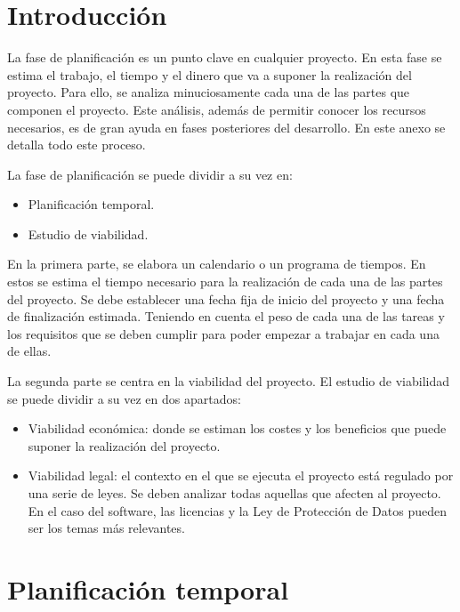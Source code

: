 
\section{Introducción}\label{introduccion-plan}

La fase de planificación es un punto clave en cualquier proyecto. En
esta fase se estima el trabajo, el tiempo y el dinero que va a suponer
la realización del proyecto. Para ello, se analiza minuciosamente cada
una de las partes que componen el proyecto. Este análisis, además de
permitir conocer los recursos necesarios, es de gran ayuda en fases
posteriores del desarrollo. En este anexo se detalla todo este proceso.

La fase de planificación se puede dividir a su vez en:

\begin{itemize}
\tightlist
\item
  Planificación temporal.
\item
  Estudio de viabilidad.
\end{itemize}

En la primera parte, se elabora un calendario o un programa de tiempos.
En estos se estima el tiempo necesario para la realización de cada una
de las partes del proyecto. Se debe establecer una fecha fija de inicio
del proyecto y una fecha de finalización estimada. Teniendo en cuenta el
peso de cada una de las tareas y los requisitos que se deben cumplir
para poder empezar a trabajar en cada una de ellas.

La segunda parte se centra en la viabilidad del proyecto. El estudio de
viabilidad se puede dividir a su vez en dos apartados:

\begin{itemize}
\tightlist
\item
  Viabilidad económica: donde se estiman los costes y los beneficios que
  puede suponer la realización del proyecto.
\item
  Viabilidad legal: el contexto en el que se ejecuta el proyecto está
  regulado por una serie de leyes. Se deben analizar todas aquellas que
  afecten al proyecto. En el caso del software, las licencias y la Ley
  de Protección de Datos pueden ser los temas más relevantes.
\end{itemize}

\section{Planificación temporal}\label{planificacion-temporal}

